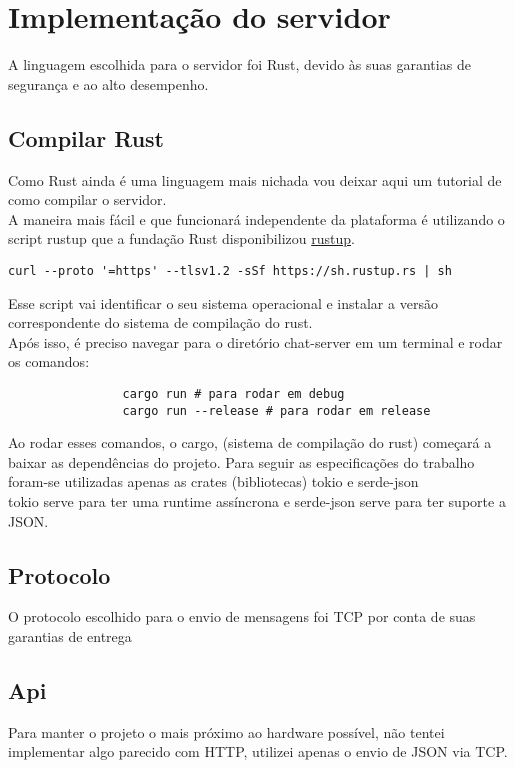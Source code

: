 \documentclass{article}
\begin{document}
\section{Implementação do servidor}
{
    A linguagem escolhida para o servidor foi Rust, devido às suas garantias de segurança e ao alto desempenho.
    \newpage
    \subsection{Compilar Rust}
    {
        Como Rust ainda é uma linguagem mais nichada vou deixar aqui um tutorial de como compilar o servidor.\\
        A maneira mais fácil e que funcionará independente da plataforma é utilizando o script rustup que a fundação Rust disponibilizou
        \href{https://rustup.rs/}{rustup}.
        \begin{verbatim}
curl --proto '=https' --tlsv1.2 -sSf https://sh.rustup.rs | sh
        \end{verbatim}
        Esse script vai identificar o seu sistema operacional e instalar a versão correspondente do sistema de compilação do rust. \\
        Após isso, é preciso navegar para o diretório chat-server em um terminal e rodar os comandos: \\
        \begin{center}
            \begin{verbatim}
                cargo run # para rodar em debug 
                cargo run --release # para rodar em release                            
            \end{verbatim}
        \end{center}
        Ao rodar esses comandos, o cargo, (sistema de compilação do rust) começará a baixar as dependências do projeto.
        Para seguir as especificações do trabalho foram-se utilizadas apenas as crates (bibliotecas) tokio e serde-json \\
        tokio serve para ter uma runtime assíncrona e serde-json serve para ter suporte a JSON.
    }    

    \subsection{Protocolo}
    {
        O protocolo escolhido para o envio de mensagens foi TCP por conta de suas garantias de entrega
    }
    \subsection{Api}
    {
        Para manter o projeto o mais próximo ao hardware possível, não tentei implementar algo parecido com HTTP, utilizei apenas o envio de JSON via TCP.
}}
\end{document}
